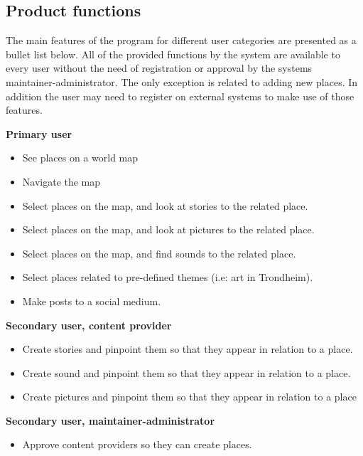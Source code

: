 \noindent

\subsection{Product functions}

The main features of the program for different user categories are presented as a bullet list below. All of the provided functions by the system are available to every user without the need of registration or approval by the systems maintainer-administrator. The only exception is related to adding new places. In addition the user may need to register on external systems to make use of those features.

\noindent


\begin{description}
\item [\textbf{Primary user}]
\end{description}
\begin{itemize}
\item See places on a world map
\item Navigate the map
\item Select places on the map, and look at stories to the related place. 
\item Select places on the map, and look at pictures to the related place.
\item Select places on the map, and find sounds to the related place.
\item Select places related to pre-defined themes (i.e: art in Trondheim).
\item Make posts to a social medium. 
\end{itemize}
\vspace{0.5cm}
\begin{description}
\item [\textbf{Secondary user, content provider}]
\end{description}
\begin{itemize}
\item Create stories and pinpoint them so that they appear in relation to a place.
\item Create sound and pinpoint them so that they appear in relation to a place.
\item Create pictures and pinpoint them so that they appear in relation to a place
\end{itemize}
\vspace{0.5cm}
\begin{description}
\item [\textbf{Secondary user, maintainer-administrator}]
\end{description}
\begin{itemize}
\item Approve content providers so they can create places.
\end{itemize}

